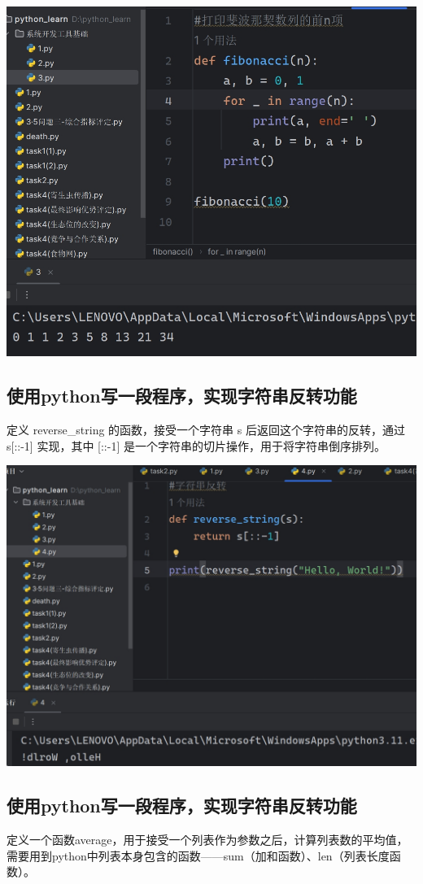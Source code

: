 \documentclass[UTF8,a4paper]{ctexart}
\begin{document}
\begin{sloppypar}
	\includegraphics[width = 14cm]{14}
	
	\subsection{使用python写一段程序，实现字符串反转功能}
	定义 reverse\_string 的函数，接受一个字符串 s 后返回这个字符串的反转，通过 s[::-1] 实现，其中 [::-1] 是一个字符串的切片操作，用于将字符串倒序排列。
	
	\includegraphics[width = 14cm]{15}
	
	
	\subsection{使用python写一段程序，实现字符串反转功能}
	定义一个函数average，用于接受一个列表作为参数之后，计算列表数的平均值，需要用到python中列表本身包含的函数——sum（加和函数）、len（列表长度函数）。
	

\end{sloppypar}
\end{document}
